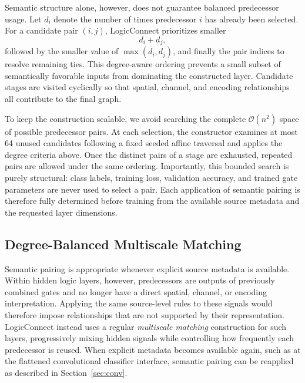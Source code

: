Semantic structure alone, however, does not guarantee balanced predecessor
usage. Let $d_i$ denote the number of times predecessor $i$ has already been
selected. For a candidate pair $(i,j)$, LogicConnect prioritizes smaller
%
\begin{equation}
d_i+d_j,
\label{eq:pair_degree}
\end{equation}
%
followed by the smaller value of $\max(d_i,d_j)$, and finally the pair indices
to resolve remaining ties. This degree-aware ordering prevents a small subset
of semantically favorable inputs from dominating the constructed layer. Candidate
stages are visited cyclically so that spatial, channel, and encoding
relationships all contribute to the final graph.

To keep the construction scalable, we avoid searching the complete
$\mathcal{O}(n^2)$ space of possible predecessor pairs. At each selection,
the constructor examines at most 64 unused candidates following a fixed
seeded affine traversal and applies the degree criteria above. Once the
distinct pairs of a stage are exhausted, repeated pairs are allowed under the
same ordering. Importantly, this bounded search is purely structural:
class labels, training loss, validation accuracy, and trained gate parameters
are never used to select a pair. Each application of semantic pairing is
therefore fully determined before training from the available source metadata
and the requested layer dimensions.


\subsection{Degree-Balanced Multiscale Matching}
\label{sec:multiscale}

Semantic pairing is appropriate whenever explicit source metadata is
available. Within hidden logic layers, however, predecessors are outputs of
previously combined gates and no longer have a direct spatial, channel, or
encoding interpretation. Applying the same source-level rules to these
signals would therefore impose relationships that are not supported by their
representation. LogicConnect instead uses a regular \emph{multiscale matching} construction for such layers, progressively mixing hidden signals
while controlling how frequently each predecessor is reused. When explicit
metadata becomes available again, such as at the flattened convolutional
classifier interface, semantic pairing can be reapplied as described in
Section~\ref{sec:conv}.

